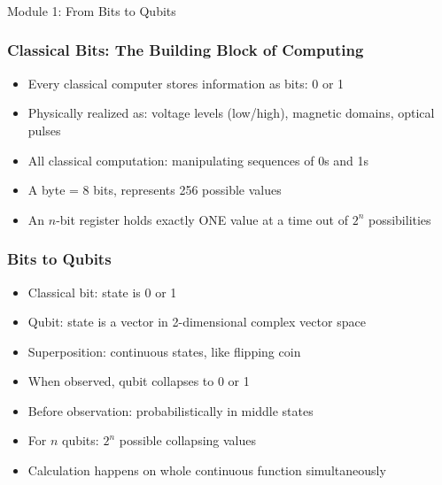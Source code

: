 
\begin{frame}[fragile]\frametitle{}
\begin{center}
{\Large Module 1: From Bits to Qubits}
\end{center}
\end{frame}

\begin{frame}[fragile]\frametitle{Classical Bits: The Building Block of Computing}
\begin{itemize}
\item Every classical computer stores information as bits: 0 or 1
\item Physically realized as: voltage levels (low/high), magnetic domains, optical pulses
\item All classical computation: manipulating sequences of 0s and 1s
\item A byte = 8 bits, represents 256 possible values
\item An $n$-bit register holds exactly ONE value at a time out of $2^n$ possibilities
\end{itemize}
\end{frame}

\begin{frame}[fragile]\frametitle{Bits to Qubits}
\begin{itemize}
\item Classical bit: state is 0 or 1
\item Qubit: state is a vector in 2-dimensional complex vector space
\item Superposition: continuous states, like flipping coin
\item When observed, qubit collapses to 0 or 1
\item Before observation: probabilistically in middle states
\item For $n$ qubits: $2^n$ possible collapsing values
\item Calculation happens on whole continuous function simultaneously
\end{itemize}
\end{frame}

